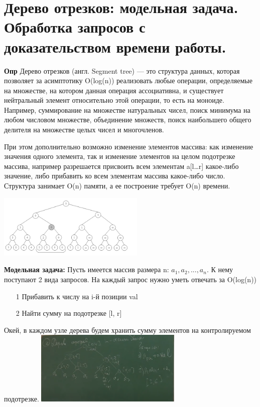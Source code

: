\section{Дерево отрезков: модельная задача. Обработка запросов с доказательством времени работы.}

\textbf{Опр} Дерево отрезков (англ. Segment tree) — это структура данных, которая позволяет за асимптотику O(log(n)) реализовать любые операции, определяемые на множестве, на котором данная операция ассоциативна, и существует нейтральный элемент относительно этой операции, то есть на моноиде. Например, суммирование на множестве натуральных чисел, поиск минимума на любом числовом множестве, объединение множеств, поиск наибольшего общего делителя на множестве целых чисел и многочленов.

При этом дополнительно возможно изменение элементов массива: как изменение значения одного элемента, так и изменение элементов на целом подотрезке массива, например разрешается присвоить всем элементам a[l…r] какое-либо значение, либо прибавить ко всем элементам массива какое-либо число. Структура занимает O(n) памяти, а ее построение требует O(n) времени.

\includegraphics[width = 7cm]{images/60-62_stree}

\textbf{Модельная задача:} Пусть имеется массив размера n: $a_1, a_2, ..., a_n$. К нему поступают 2 вида запросов. На каждый запрос нужно уметь отвечать за O(log(n))
\begin{itemize}
    \item[1] Прибавить к числу на i-й позиции val
    \item[2] Найти сумму на подотрезке [l, r]
\end{itemize}

Окей, в каждом узле дерева будем хранить сумму элементов на контролируемом подотрезке.
\includegraphics[width = 7cm]{images/60-62_sttask}

